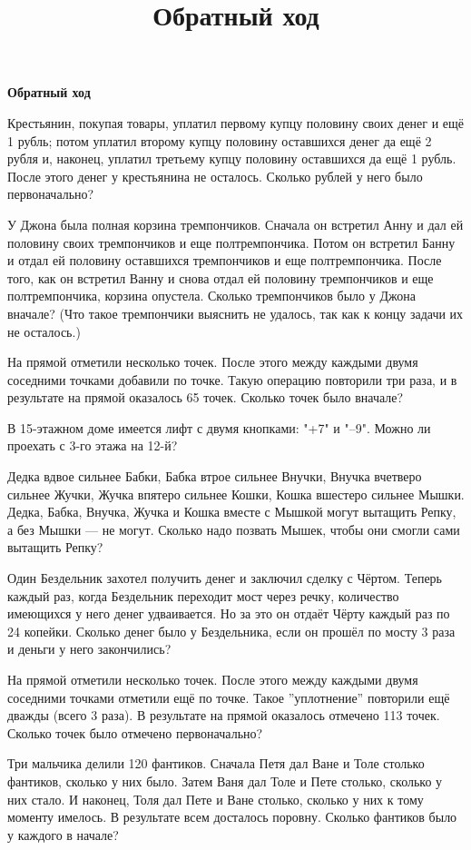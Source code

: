 \centerline{\bf \Huge Обратный ход}
\title{Обратный ход}


 Крестьянин, покупая товары, уплатил первому купцу половину своих денег и ещё 1 рубль; потом уплатил второму купцу половину оставшихся денег да ещё 2 рубля и, наконец, уплатил третьему купцу половину оставшихся да ещё 1 рубль. После этого денег у крестьянина не осталось. Сколько рублей у него было первоначально?

 У Джона была полная корзина тремпончиков. Сначала он встретил Анну и дал ей половину своих тремпончиков и еще полтремпончика. Потом он встретил Банну и отдал ей половину оставшихся тремпончиков и еще полтремпончика. После того, как он встретил Ванну и снова отдал ей половину тремпончиков и еще полтремпончика, корзина опустела. Сколько тремпончиков было у Джона вначале? (Что такое тремпончики выяснить не удалось, так как к концу задачи их не осталось.)

 На прямой отметили несколько точек. После этого между каждыми двумя соседними точками добавили по точке. Такую операцию повторили три раза, и в результате на прямой оказалось 65 точек. Сколько точек было вначале?

 В 15-этажном доме имеется лифт с двумя кнопками: "+7" и "–9". Можно ли проехать с 3-го этажа на 12-й? 

 Дедка вдвое сильнее Бабки, Бабка втрое сильнее Внучки, Внучка вчетверо сильнее Жучки, Жучка впятеро сильнее Кошки, Кошка вшестеро сильнее Мышки. Дедка, Бабка, Внучка, Жучка и Кошка вместе с Мышкой могут вытащить Репку, а без Мышки — не могут. Сколько надо позвать Мышек, чтобы они смогли сами вытащить Репку?

 Один Бездельник захотел получить денег и заключил сделку с Чёртом. Теперь каждый раз, когда Бездельник переходит мост через речку, количество имеющихся у него денег удваивается. Но за это он отдаёт Чёрту каждый раз по 24 копейки. Сколько денег было у Бездельника, если он прошёл по мосту 3 раза и деньги у него закончились?

 На прямой отметили несколько точек. После этого между каждыми двумя соседними точками отметили ещё по точке. Такое ''уплотнение'' повторили ещё дважды (всего 3 раза). В результате на прямой оказалось отмечено 113 точек. Сколько точек было отмечено первоначально? 

 Три мальчика делили 120 фантиков. Сначала Петя дал Ване и Толе столько фантиков, сколько у них было. Затем Ваня дал Толе и Пете столько, сколько у них стало. И наконец, Толя дал Пете и Ване столько, сколько у них к тому моменту имелось. В результате всем досталось поровну. Сколько фантиков было у каждого в начале? 

